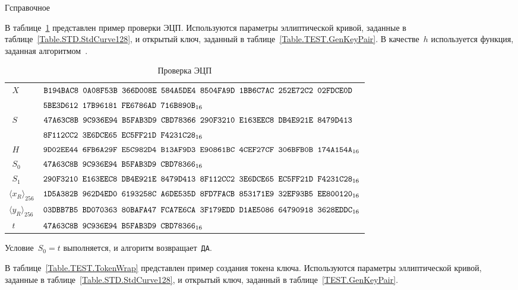 \begin{appendix}{Г}{справочное}
\label{TEST.Verify}

В таблице~\ref{Table.TEST.Verify} представлен пример проверки ЭЦП.
%
Используются параметры эллиптической кривой, 
заданные в таблице~\ref{Table.STD.StdCurve128},
и открытый ключ, заданный в таблице~\ref{Table.TEST.GenKeyPair}. 
%
В качестве~$h$ используется функция,
заданная алгоритмом~.

\clearpage

\begin{table}[!h]
\caption{Проверка ЭЦП}\label{Table.TEST.Verify}
{\small
\begin{tabular}{|l|l|}
\hline
$\phantom{\langle}X$ & 
$\texttt{B194BAC8~0A08F53B~366D008E~584A5DE4~8504FA9D~1BB6C7AC~252E72C2~02FDCE0D}$\\
&
$\texttt{5BE3D612~17B96181~FE6786AD~716B890B}_{16}$\\
%
\hline
$\phantom{\langle}S$ & 
$\texttt{47A63C8B~9C936E94~B5FAB3D9~CBD78366~290F3210~E163EEC8~DB4E921E~8479D413}$\\
&
$\texttt{8F112CC2~3E6DCE65~EC5FF21D~F4231C28}_{16}$\\
\dhline
%
$\phantom{\langle}H$ & 
$\texttt{9D02EE44~6FB6A29F~E5C982D4~B13AF9D3~E90861BC~4CEF27CF~306BFB0B~174A154A}_{16}$\\
%
\hline
$\phantom{\langle}S_0$ & 
$\texttt{47A63C8B~9C936E94~B5FAB3D9~CBD78366}_{16}$\\
%
\hline
$\phantom{\langle}S_1$ & 
$\texttt{290F3210~E163EEC8~DB4E921E~8479D413~8F112CC2~3E6DCE65~EC5FF21D~F4231C28}_{16}$\\
%
\hline
$\langle x_R\rangle_{256}$ & 
$\texttt{1D5A382B~962D4ED0~6193258C~A6DE535D~8FD7FACB~853171E9~32EF93B5~EE800120}_{16}$\\
%
\hline
$\langle y_R\rangle_{256}$ & 
$\texttt{03DBB7B5~BD070363~80BAFA47~FCA7E6CA~3F179EDD~D1AE5086~64790918~3628EDDC}_{16}$\\
\hline
$\phantom{\langle}t$ & 
$\texttt{47A63C8B~9C936E94~B5FAB3D9~CBD78366}_{16}$\\
\hline
\end{tabular}
}
\end{table}

Условие~$S_0=t$ выполняется, 
и алгоритм возвращает~\texttt{ДА}.

\label{TEST.TokenWrap}

В таблице~\ref{Table.TEST.TokenWrap} представлен пример создания токена ключа.
%
Используются параметры эллиптической кривой, 
заданные в таблице~\ref{Table.STD.StdCurve128},
и открытый ключ, заданный в таблице~\ref{TEST.GenKeyPair}.


\end{appendix}
